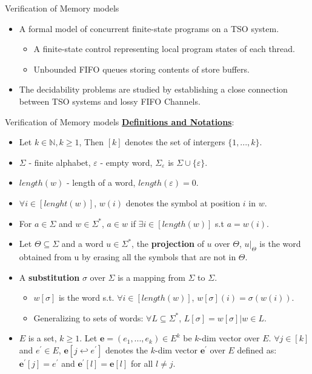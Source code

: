 \documentclass[9pt]{beamer}
\begin{document}
\begin{frame}{Verification of Memory models}
\begin{itemize}
\item A formal model of concurrent finite-state programs on a TSO system.
	\begin{itemize}
	\item A finite-state control representing local program states of each thread.
  \item Unbounded FIFO queues storing contents of store buffers.
	\end{itemize}
\pause
\item The decidability problems are studied by establishing a close connection
      between TSO systems and lossy FIFO Channels.
\end{itemize}
\end{frame}

\begin{frame}{Verification of Memory models}
\underline{\textbf{Definitions and Notations}}:\\

\begin{itemize}
\item Let $k \in \mathbb{N}, k \ge 1$, Then $[k]$ denotes the set of intergers
$\{1,...,k\}$.
\item $\Sigma$ - finite alphabet, $\varepsilon$ - empty word, $\Sigma_\varepsilon$ is $\Sigma \cup \{\varepsilon\}$.
\item $length(w)$ - length of a word, $length(\varepsilon) = 0$.
\item $\forall i \in [lenght(w)]$, $w(i)$ denotes the symbol at position $i$ in $w$.
\item For $a \in \Sigma$ and $w \in \Sigma^{*}$, $a \in w$ if $\exists i \in [length(w)]$ s.t $a=w(i)$.
\pause
\item Let $\Theta \subseteq \Sigma$ and a word $u \in \Sigma^{*}$, the \textbf{projection} of $u$ over $\Theta$, $u|_\Theta$
      is the word obtained from u by erasing all the symbols that are not in $\Theta$.
\pause
\item A \textbf{substitution} $\sigma$ over $\Sigma$ is a mapping from $\Sigma$ to $\Sigma$.
	\begin{itemize}
	\item $w[\sigma]$ is the word s.t. $\forall i \in [length(w)]$, $w[\sigma](i) = \sigma(w(i))$.
  \item Generalizing to sets of words: $\forall L \subseteq \Sigma^*$, $L[\sigma] = {w[\sigma] | w \in L}$.
  \end{itemize}
\pause
\item $E$ is a set, $k \ge 1$. Let $\mathbf{e} = (e_1,...,e_k) \in E^k$ be $k$-dim vector over $E$.
      $\forall j \in [k]$ and $e^{\prime} \in E$, $\mathbf{e}[j \hookleftarrow e^{\prime}]$ denotes the $k$-dim vector
      $\mathbf{e}^{\prime}$ over $E$ defined as: $\mathbf{e^{\prime}}[j] = e^{\prime}$ and $\mathbf{e^{\prime}}[l] = \mathbf{e}[l]$ 
      for all $l \neq j$.
\end{itemize}
\end{frame}
\end{document}
